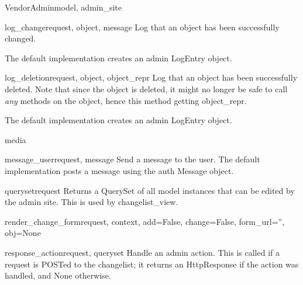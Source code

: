 \documentclass[letterpaper,10pt,english]{sphinxmanual}
\begin{document}
\begin{classdesc}{VendorAdmin}{model, admin\_site}
\hypertarget{data.admin.VendorAdmin.log_change}{}\begin{methoddesc}{log\_change}{request, object, message}
Log that an object has been successfully changed.

The default implementation creates an admin LogEntry object.
\end{methoddesc}

\hypertarget{data.admin.VendorAdmin.log_deletion}{}\begin{methoddesc}{log\_deletion}{request, object, object\_repr}
Log that an object has been successfully deleted. Note that since the
object is deleted, it might no longer be safe to call \emph{any} methods
on the object, hence this method getting object\_repr.

The default implementation creates an admin LogEntry object.
\end{methoddesc}

\hypertarget{data.admin.VendorAdmin.media}{}\begin{memberdesc}{media}\end{memberdesc}

\hypertarget{data.admin.VendorAdmin.message_user}{}\begin{methoddesc}{message\_user}{request, message}
Send a message to the user. The default implementation
posts a message using the auth Message object.
\end{methoddesc}

\hypertarget{data.admin.VendorAdmin.queryset}{}\begin{methoddesc}{queryset}{request}
Returns a QuerySet of all model instances that can be edited by the
admin site. This is used by changelist\_view.
\end{methoddesc}

\hypertarget{data.admin.VendorAdmin.render_change_form}{}\begin{methoddesc}{render\_change\_form}{request, context, add=False, change=False, form\_url='', obj=None}\end{methoddesc}

\hypertarget{data.admin.VendorAdmin.response_action}{}\begin{methoddesc}{response\_action}{request, queryset}
Handle an admin action. This is called if a request is POSTed to the
changelist; it returns an HttpResponse if the action was handled, and
None otherwise.
\end{methoddesc}


\end{classdesc}
\end{document}
